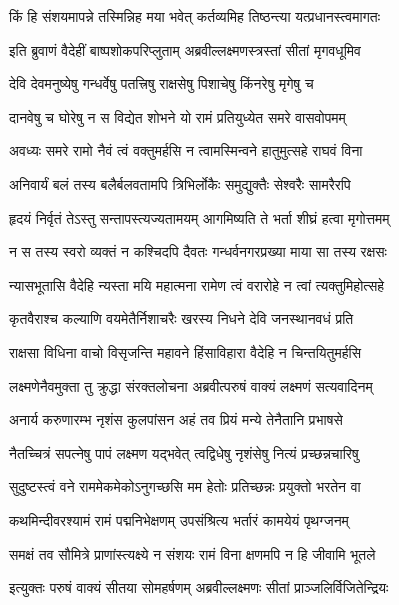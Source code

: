 \twolineshloka
{किं हि संशयमापन्ने तस्मिन्निह मया भवेत्}
{कर्तव्यमिह तिष्ठन्त्या यत्प्रधानस्त्वमागतः} %

\twolineshloka
{इति ब्रुवाणं वैदेहीं बाष्पशोकपरिप्लुताम्}
{अब्रवील्लक्ष्मणस्त्रस्तां सीतां मृगवधूमिव} %

\twolineshloka
{देवि देवमनुष्येषु गन्धर्वेषु पतत्त्रिषु}
{राक्षसेषु पिशाचेषु किंनरेषु मृगेषु च} %

\twolineshloka
{दानवेषु च घोरेषु न स विद्येत शोभने}
{यो रामं प्रतियुध्येत समरे वासवोपमम्} %

\twolineshloka
{अवध्यः समरे रामो नैवं त्वं वक्तुमर्हसि}
{न त्वामस्मिन्वने हातुमुत्सहे राघवं विना} %

\twolineshloka
{अनिवार्यं बलं तस्य बलैर्बलवतामपि}
{त्रिभिर्लोकैः समुद्युक्तैः सेश्वरैः सामरैरपि} %

\twolineshloka
{हृदयं निर्वृतं तेऽस्तु सन्तापस्त्यज्यतामयम्}
{आगमिष्यति ते भर्ता शीघ्रं हत्वा मृगोत्तमम्} %

\twolineshloka
{न स तस्य स्वरो व्यक्तं न कश्चिदपि दैवतः}
{गन्धर्वनगरप्रख्या माया सा तस्य रक्षसः} %

\twolineshloka
{न्यासभूतासि वैदेहि न्यस्ता मयि महात्मना}
{रामेण त्वं वरारोहे न त्वां त्यक्तुमिहोत्सहे} %

\twolineshloka
{कृतवैराश्च कल्याणि वयमेतैर्निशाचरैः}
{खरस्य निधने देवि जनस्थानवधं प्रति} %

\twolineshloka
{राक्षसा विधिना वाचो विसृजन्ति महावने}
{हिंसाविहारा वैदेहि न चिन्तयितुमर्हसि} %

\twolineshloka
{लक्ष्मणेनैवमुक्ता तु क्रुद्धा संरक्तलोचना}
{अब्रवीत्परुषं वाक्यं लक्ष्मणं सत्यवादिनम्} %

\twolineshloka
{अनार्य करुणारम्भ नृशंस कुलपांसन}
{अहं तव प्रियं मन्ये तेनैतानि प्रभाषसे} %

\twolineshloka
{नैतच्चित्रं सपत्नेषु पापं लक्ष्मण यद्भवेत्}
{त्वद्विधेषु नृशंसेषु नित्यं प्रच्छन्नचारिषु} %

\twolineshloka
{सुदुष्टस्त्वं वने राममेकमेकोऽनुगच्छसि}
{मम हेतोः प्रतिच्छन्नः प्रयुक्तो भरतेन वा} %

\twolineshloka
{कथमिन्दीवरश्यामं रामं पद्मनिभेक्षणम्}
{उपसंश्रित्य भर्तारं कामयेयं पृथग्जनम्} %

\twolineshloka
{समक्षं तव सौमित्रे प्राणांस्त्यक्ष्ये न संशयः}
{रामं विना क्षणमपि न हि जीवामि भूतले} %

\twolineshloka
{इत्युक्तः परुषं वाक्यं सीतया सोमहर्षणम्}
{अब्रवील्लक्ष्मणः सीतां प्राञ्जलिर्विजितेन्द्रियः} %

